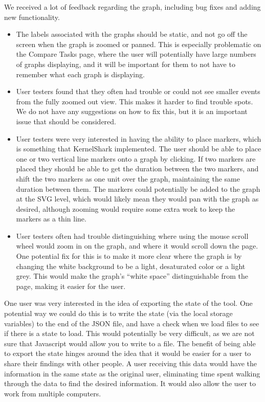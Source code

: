 \documentclass{hmcclinic}
\begin{document}
We received a lot of feedback regarding the graph, including bug fixes and adding new functionality.
  \begin{itemize}

  \item The labels associated with the graphs should be static, and not go off the screen when 
  the graph is zoomed or panned. This is especially problematic on the Compare Tasks page, 
  where the user will potentially have large numbers of graphs displaying, and it will be 
  important for them to not have to remember what each graph is displaying.

  \item User testers found that they often had trouble or could not see smaller events 
  from the fully zoomed out view. This makes it harder to find trouble spots. We do not 
  have any suggestions on how to fix this, but it is an important issue that should be 
  considered.

  \item User testers were very interested in having the ability to place markers, which 
  is something that KernelShark implemented. The user should be able to place one or two
   vertical line markers onto a graph by clicking. If two markers are placed they should
    be able to get the duration between the two markers, and shift the two markers as one
     unit over the graph, maintaining the same duration between them. The markers could
      potentially be added to the graph at the SVG level, which would likely mean they 
      would pan with the graph as desired, although zooming would require some extra 
      work to keep the markers as a thin line.

  \item User testers often had trouble distinguishing where using the mouse scroll wheel
   would zoom in on the graph, and where it would scroll down the page. One potential fix
    for this is to make it more clear where the graph is by changing the white background
     to be a light, desaturated color or a light grey. This would make the
     graph's ``white
      space'' distinguishable from the page, making it easier for the user.

  \end{itemize}

One user was very interested in the idea of exporting the state of the tool. One 
potential way we could do this is to write the state (via the local storage variables)
 to the end of the JSON file, and have a check when we load files to see if there 
 is a state to load. This would potentially be very difficult, as we are not sure 
 that Javascript would allow you to write to a file. The benefit of being able to 
 export the state hinges around the idea that it would be easier for a user to 
 share their findings with other people. A user receiving this data would have the 
 information in the same state as the original user, eliminating time spent walking 
 through the data to find the desired information. It would also allow the user to 
 work from multiple computers.
\end{document}
